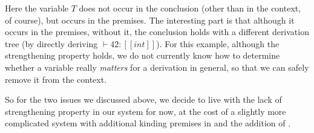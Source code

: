 \noindent Here the variable $T$ does not occur in the conclusion
(other than in the context, of course), but occurs in
the premises. The interesting part is that although it occurs in the premises, without
it, the conclusion holds with a different derivation tree (by directly deriving $\vdash 42 : [[int]]$).
For this example, although the strengthening property holds, we do not currently
know how to determine whether a variable really \emph{matters} for a derivation
in general, so that we can safely remove it from the context.

So for the two issues we discussed above, we decide to live with the lack of
strengthening property in our system for now, at the cost of a slightly more
complicated system with additional kinding premises in 
and the addition of .
